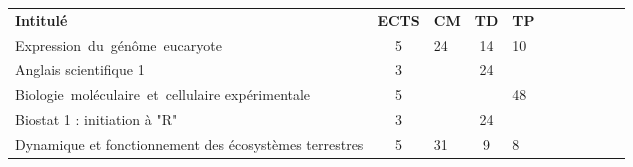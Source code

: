 


\renewcommand{\arraystretch}{1.5}%
\begin{tabular}{|m{5cm}|cm{0.75cm}|cm{0.75cm}|cm{0.75cm}|cm{0.75cm}|cm{0.75cm}|}
\cline{1-5}

\cellcolor{couleurFonce} \color{white}\bfseries Intitul\'e & \cellcolor{couleurFonce} \color{white}\bfseries ECTS & \cellcolor{couleurFonce} \color{white}\bfseries CM & \cellcolor{couleurFonce} \color{white}\bfseries TD & \cellcolor{couleurFonce} \color{white}\bfseries TP \\ \cline{1-5}
 \color{black} \mbox{Expression du génôme eucaryote} & \color{black} 5 & \color{black} 24 & \color{black} 14 & \color{black} 10 \\ \cline{1-5}

 \cellcolor{couleurClaire} \color{couleurTexte} Anglais scientifique 1  & \cellcolor{couleurClaire} \color{couleurTexte} 3 & \cellcolor{couleurClaire} \color{couleurTexte} & \cellcolor{couleurClaire} \color{couleurTexte} 24 & \cellcolor{couleurClaire} \color{couleurTexte} \\ \cline{1-5}

 \color{black} \mbox{Biologie moléculaire et cellulaire} \mbox{expérimentale} & \color{black} 5 & \color{black} & \color{black} & \color{black} 48 \\ \cline{1-5}

 \cellcolor{couleurClaire} \color{couleurTexte} Biostat 1 : initiation à "R"  & \cellcolor{couleurClaire} \color{couleurTexte} 3 & \cellcolor{couleurClaire} \color{couleurTexte} & \cellcolor{couleurClaire} \color{couleurTexte} 24 & \cellcolor{couleurClaire} \color{couleurTexte} 
\\ \cline{1-5}

 \color{black} Dynamique et fonctionnement des écosystèmes terrestres & \color{black} 5 & \color{black} 31 & \color{black} 9 & \color{black} 8 \\ \cline{1-5}


\end{tabular}
